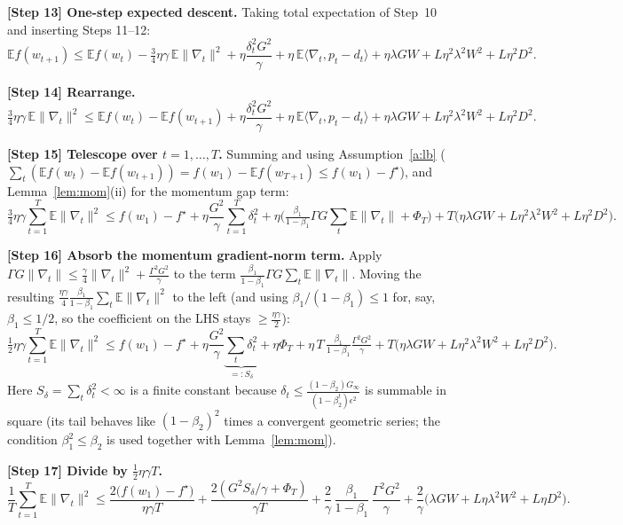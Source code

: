 \documentclass[11pt]{article}
\begin{document}
\noindent\textbf{[Step 13] One-step expected descent.}
Taking total expectation of Step~10 and inserting Steps 11--12:
\[
\mathbb{E} f(w_{t+1})
\le \mathbb{E} f(w_t)
- \tfrac{3}{4}\eta\gamma\,\mathbb{E}\|\nabla_t\|^2
+\eta\frac{\delta_t^2G^2}{\gamma}
+\eta\,\mathbb{E}\langle\nabla_t,p_t-d_t\rangle
+\eta\lambda G W
+L\eta^2\lambda^2W^2 + L\eta^2 D^2 .
\]

\noindent\textbf{[Step 14] Rearrange.}
\[
\tfrac{3}{4}\eta\gamma\,\mathbb{E}\|\nabla_t\|^2
\le \mathbb{E} f(w_t)-\mathbb{E} f(w_{t+1})
+\eta\frac{\delta_t^2G^2}{\gamma}
+\eta\,\mathbb{E}\langle\nabla_t,p_t-d_t\rangle
+\eta\lambda G W
+L\eta^2\lambda^2W^2 + L\eta^2 D^2 .
\]

\noindent\textbf{[Step 15] Telescope over $t=1,\dots,T$.}
Summing and using Assumption~\ref{a:lb}
($\sum_t(\mathbb{E} f(w_t)-\mathbb{E} f(w_{t+1}))=f(w_1)-\mathbb{E} f(w_{T+1})\le f(w_1)-f^\star$),
and Lemma~\ref{lem:mom}(ii) for the momentum gap term:
\[
\tfrac{3}{4}\eta\gamma\sum_{t=1}^T\mathbb{E}\|\nabla_t\|^2
\le f(w_1)-f^\star
+\eta\frac{G^2}{\gamma}\sum_{t=1}^T\delta_t^2
+\eta\Big(\tfrac{\beta_1}{1-\beta_1}\Gamma G\!\sum_t\mathbb{E}\|\nabla_t\|+\Phi_T\Big)
+T\big(\eta\lambda G W + L\eta^2\lambda^2W^2 + L\eta^2 D^2\big).
\]

\noindent\textbf{[Step 16] Absorb the momentum gradient-norm term.}
Apply $\Gamma G\|\nabla_t\|\le\frac{\gamma}{4}\|\nabla_t\|^2+\frac{\Gamma^2G^2}{\gamma}$
to the term $\frac{\beta_1}{1-\beta_1}\Gamma G\sum_t\mathbb{E}\|\nabla_t\|$. Moving the
resulting $\frac{\eta\gamma}{4}\frac{\beta_1}{1-\beta_1}\sum_t\mathbb{E}\|\nabla_t\|^2$
to the left (and using $\beta_1/(1-\beta_1)\le 1$ for, say, $\beta_1\le1/2$, so the
coefficient on the LHS stays $\ge\frac{\eta\gamma}{2}$):
\[
\tfrac{1}{2}\eta\gamma\sum_{t=1}^T\mathbb{E}\|\nabla_t\|^2
\le f(w_1)-f^\star
+\eta\frac{G^2}{\gamma}\underbrace{\sum_{t}\delta_t^2}_{=:S_\delta}
+\eta\Phi_T
+\eta\,T\,\tfrac{\beta_1}{1-\beta_1}\tfrac{\Gamma^2G^2}{\gamma}
+T\big(\eta\lambda G W + L\eta^2\lambda^2W^2 + L\eta^2 D^2\big).
\]
Here $S_\delta=\sum_t\delta_t^2<\infty$ is a finite constant because
$\delta_t\le\frac{(1-\beta_2)G_\infty}{(1-\beta_2^t)\epsilon^2}$ is summable in square
(its tail behaves like $(1-\beta_2)^2$ times a convergent geometric series; the
condition $\beta_1^2\le\beta_2$ is used together with Lemma~\ref{lem:mom}).

\noindent\textbf{[Step 17] Divide by $\tfrac12\eta\gamma T$.}
\[
\frac1T\sum_{t=1}^T\mathbb{E}\|\nabla_t\|^2
\le
\frac{2\big(f(w_1)-f^\star\big)}{\eta\gamma T}
+\frac{2(G^2 S_\delta/\gamma+\Phi_T)}{\gamma T}
+\frac{2}{\gamma}\,\frac{\beta_1}{1-\beta_1}\,\frac{\Gamma^2G^2}{\gamma}
+\frac{2}{\gamma}\Big(\lambda G W + L\eta\lambda^2W^2 + L\eta D^2\Big).
\]
\end{document}
